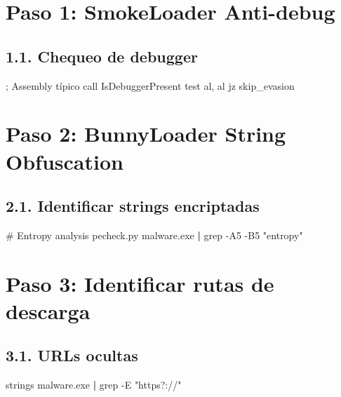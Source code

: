 \documentclass[
  letterpaper,
]{report}
\newenvironment{Shaded}{\begin{snugshade}}{\end{snugshade}}
\newcommand{\AttributeTok}[1]{\textcolor[rgb]{0.40,0.45,0.13}{#1}}
\newcommand{\CommentTok}[1]{\textcolor[rgb]{0.37,0.37,0.37}{#1}}
\newcommand{\ExtensionTok}[1]{\textcolor[rgb]{0.00,0.23,0.31}{#1}}
\newcommand{\FunctionTok}[1]{\textcolor[rgb]{0.28,0.35,0.67}{#1}}
\newcommand{\KeywordTok}[1]{\textcolor[rgb]{0.00,0.23,0.31}{\textbf{#1}}}
\newcommand{\NormalTok}[1]{\textcolor[rgb]{0.00,0.23,0.31}{#1}}
\newcommand{\StringTok}[1]{\textcolor[rgb]{0.13,0.47,0.30}{#1}}
\begin{document}
\section{Paso 1: SmokeLoader
Anti-debug}\label{paso-1-smokeloader-anti-debug}

\subsection{1.1. Chequeo de debugger}\label{chequeo-de-debugger}

\begin{Shaded}
\begin{Highlighting}[]
\NormalTok{; Assembly típico}
\NormalTok{call IsDebuggerPresent}
\NormalTok{test al, al}
\NormalTok{jz skip\_evasion}
\end{Highlighting}
\end{Shaded}

\section{Paso 2: BunnyLoader String
Obfuscation}\label{paso-2-bunnyloader-string-obfuscation}

\subsection{2.1. Identificar strings
encriptadas}\label{identificar-strings-encriptadas}

\begin{Shaded}
\begin{Highlighting}[]
\CommentTok{\# Entropy analysis}
\ExtensionTok{pecheck.py}\NormalTok{ malware.exe }\KeywordTok{|} \FunctionTok{grep} \AttributeTok{{-}A5} \AttributeTok{{-}B5} \StringTok{"entropy"}
\end{Highlighting}
\end{Shaded}

\section{Paso 3: Identificar rutas de
descarga}\label{paso-3-identificar-rutas-de-descarga}

\subsection{3.1. URLs ocultas}\label{urls-ocultas}

\begin{Shaded}
\begin{Highlighting}[]
\FunctionTok{strings}\NormalTok{ malware.exe }\KeywordTok{|} \FunctionTok{grep} \AttributeTok{{-}E} \StringTok{"https?://"}
\end{Highlighting}
\end{Shaded}
\end{document}
